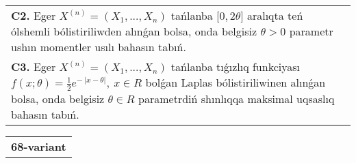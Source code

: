 \documentclass{article}
\begin{document}
\begin{tabular}{m{17cm}}
 \\
\textbf{C2.} 
Eger \(X^{(n)} = \left( X_{1},...,X_{n} \right)\) tańlanba {[}\(0,2\theta\rbrack\) aralıqta teń ólshemli bólistiriliwden alınǵan bolsa, onda belgisiz \(\theta > 0\) parametr ushın momentler usılı bahasın tabıń.
 \\
\textbf{C3.} 
Eger \(X^{(n)} = \left( X_{1},...,X_{n} \right)\) tańlanba tıǵızlıq funkciyası
$f(x;\theta) = \frac{1}{2}e^{- \ |x - \theta|},\ x \in R$
bolǵan Laplas bólistiriliwinen alınǵan bolsa, onda belgisiz \(\theta \in R\) parametrdiń shınlıqqa maksimal uqsaslıq bahasın tabıń.
 \\

\end{tabular}
\vspace{1cm}


\begin{tabular}{m{17cm}}
\textbf{68-variant}
\newline


\end{tabular}
\end{document}
